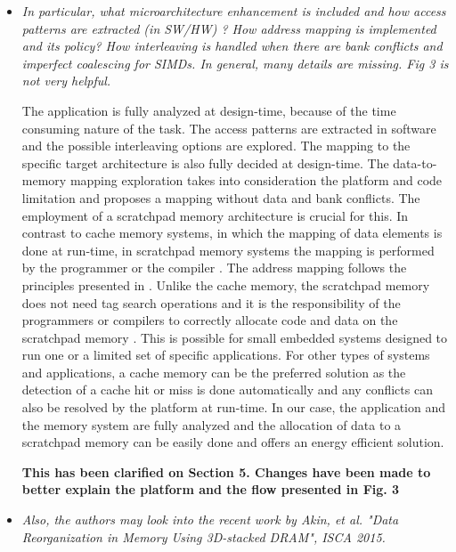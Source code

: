 \documentclass[12pt,a4paper,notitlepage]{article}
\begin{document}
\begin{itemize}

\item \textit{In particular, what microarchitecture enhancement is included and how access patterns are extracted (in SW/HW) ?  How address mapping is implemented and its policy?  How interleaving is handled when there are bank conflicts and imperfect coalescing for SIMDs.  In general,  many details are missing.  Fig 3 is not very helpful.}

The application is fully analyzed at design-time, because of the time consuming nature of the task. 
The access patterns are extracted in software and the possible interleaving options are explored. 
The mapping to the specific target architecture is also fully decided at design-time.
The data-to-memory mapping exploration takes into consideration the platform and code limitation and proposes a mapping without data and bank conflicts.
The employment of a scratchpad memory architecture is crucial for this.
In contrast to cache memory systems, in which the mapping of data elements is done at run-time, in scratchpad memory systems the mapping is performed by the programmer or the compiler \cite{ishitobi2007code}. 
The address mapping follows the principles presented in \cite{address}. 
Unlike the cache memory, the scratchpad memory does not need tag search operations and it is the responsibility of the programmers or compilers to correctly allocate code and data on the scratchpad memory \cite{steinke2002assigning}.
This is possible for small embedded systems designed to run one or a limited set of specific applications. 
For other types of systems and applications, a cache memory can be the preferred solution as the detection of a cache hit or miss is done automatically and any conflicts can also be resolved by the platform at run-time.
In our case, the application and the memory system are fully analyzed and the allocation of data to a scratchpad memory can be easily done and offers an energy efficient solution.

\textbf{This has been clarified on Section 5. Changes have been made to better explain the platform and the flow presented in Fig. 3}

\item \textit{Also, the authors may look into the recent work by Akin, et al. "Data Reorganization in Memory Using 3D-stacked DRAM", ISCA 2015.}


\end{itemize}
\end{document}
